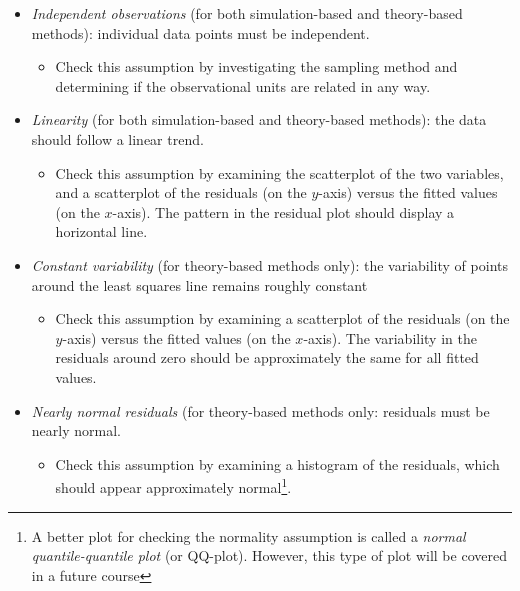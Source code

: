 \documentclass[
]{report}
\providecommand{\tightlist}{%
  \setlength{\itemsep}{0pt}\setlength{\parskip}{0pt}}
\begin{document}
\begin{itemize}
\tightlist
\item
  \emph{Independent observations} (for both simulation-based and theory-based methods): individual data points must be independent.

  \begin{itemize}
  \tightlist
  \item
    Check this assumption by investigating the sampling method and determining if the observational units are related in any way.
  \end{itemize}
\item
  \emph{Linearity} (for both simulation-based and theory-based methods): the data should follow a linear trend.

  \begin{itemize}
  \tightlist
  \item
    Check this assumption by examining the scatterplot of the two variables, and a scatterplot of the residuals (on the \(y\)-axis) versus the fitted values (on the \(x\)-axis). The pattern in the residual plot should display a horizontal line.
  \end{itemize}
\item
  \emph{Constant variability} (for theory-based methods only): the variability of points around the least squares line remains roughly constant

  \begin{itemize}
  \tightlist
  \item
    Check this assumption by examining a scatterplot of the residuals (on the \(y\)-axis) versus the fitted values (on the \(x\)-axis). The variability in the residuals around zero should be approximately the same for all fitted values.
  \end{itemize}
\item
  \emph{Nearly normal residuals} (for theory-based methods only: residuals must be nearly normal.

  \begin{itemize}
  \tightlist
  \item
    Check this assumption by examining a histogram of the residuals, which should appear approximately normal\footnote{A better plot for checking the normality assumption is called a \emph{normal quantile-quantile plot} (or QQ-plot). However, this type of plot will be covered in a future course}.
  \end{itemize}
\end{itemize}
\end{document}
